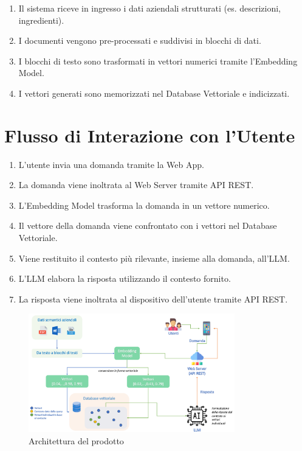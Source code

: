 \begin{enumerate}
    \item Il sistema riceve in ingresso i dati aziendali strutturati (es. descrizioni, ingredienti).
    \item I documenti vengono pre-processati e suddivisi in blocchi di dati.
    \item I blocchi di testo sono trasformati in vettori numerici tramite l'Embedding Model.
    \item I vettori generati sono memorizzati nel Database Vettoriale e indicizzati.
\end{enumerate}

\section*{Flusso di Interazione con l'Utente}

\begin{enumerate}
    \item L'utente invia una domanda tramite la Web App.
    \item La domanda viene inoltrata al Web Server tramite API REST.
    \item L'Embedding Model trasforma la domanda in un vettore numerico.
    \item Il vettore della domanda viene confrontato con i vettori nel Database Vettoriale.
    \item Viene restituito il contesto più rilevante, insieme alla domanda, all'LLM.
    \item L'LLM elabora la risposta utilizzando il contesto fornito.
    \item La risposta viene inoltrata al dispositivo dell'utente tramite API REST.
\end{enumerate}

\begin{figure}[h]
    \centering
    \includegraphics[width=0.8\textwidth]{img/architettura.png}
    \caption{Architettura del prodotto}
    \label{fig:architettura}
\end{figure}


